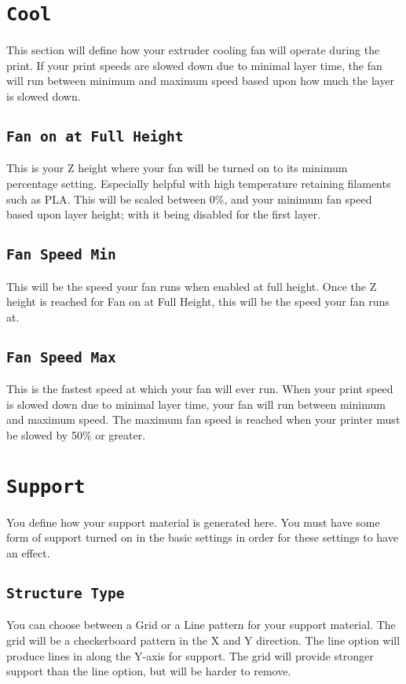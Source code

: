 \section{\texttt{Cool}}
This section will define how your extruder cooling fan will operate during the print. If your print speeds are slowed down due to minimal layer time, the fan will run between minimum and maximum speed based upon how much the layer is slowed down.

\subsection{\texttt{Fan on at Full Height}}
This is your Z height where your fan will be turned on to its minimum percentage setting. Especially helpful with high temperature retaining filaments such as PLA. This will be scaled between 0\%, and your minimum fan speed based upon layer height; with it being disabled for the first layer.

\subsection{\texttt{Fan Speed Min}}

This will be the speed your fan runs when enabled at full height. Once the Z height is reached for Fan on at Full Height, this will be the speed your fan runs at.

\subsection{\texttt{Fan Speed Max}}
This is the fastest speed at which your fan will ever run. When your print speed is slowed down due to minimal layer time, your fan will run between minimum and maximum speed. The maximum fan speed is reached when your printer must be slowed by 50\% or greater.

\section{\texttt{Support}}
You define how your support material is generated here. You must have some form of support turned on in the basic settings in order for these settings to have an effect.

\subsection{\texttt{Structure Type}}
You can choose between a Grid or a Line pattern for your support material. The grid will be a checkerboard pattern in the X and Y direction. The line option will produce lines in along the Y-axis for support. The grid will provide stronger support than the line option, but will be harder to remove.

